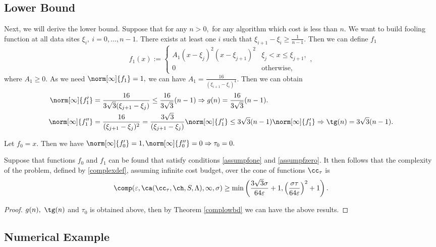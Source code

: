 \subsection{Lower Bound}
Next, we will derive the lower bound. Suppose that for any $n>0,$ for any algorithm which cost is less than $n.$
We want to build fooling function at all data sites $\xi_{i}, \ i=0,\ldots,n-1.$
There exists at least one $i$ such that $\xi_{i+1}-\xi_{i}\ge\frac{1}{n-1}.$
Then we can define $f_{1}$
$$f_{1}(x):=\left\{\begin{matrix}
A_{1}(x-\xi_{j})^{2}(x-\xi_{j+1})^{2} & \xi_{j}< x \leq \xi_{j+1},\\
0 & \text{otherwise},
\end{matrix}\right.,$$
where $A_{1} \ge 0.$ As we need $\norm[\infty]{f_1}=1,$ we can have $A_{1}=\frac{16}{(\xi_{i+1}-\xi_{i})^4}.$
Then we can obtain
\begin{align*}
\norm[\infty]{f'_1}&=\frac{16}{3\sqrt{3}(\xi_{j+1}-\xi_{j})}\leq \frac{16}{3\sqrt{3}}(n-1) \Rightarrow g(n)=\frac{16}{3\sqrt{3}}(n-1).\\
\norm[\infty]{f''_1}&=\frac{16}{(\xi_{j+1}-\xi_{j})^2}
=\frac{3\sqrt{3}}{(\xi_{j+1}-\xi_{j})}\norm[\infty]{f'_1}
 \leq 3\sqrt{3}(n-1)\norm[\infty]{f'_1}\Rightarrow \tg(n)=3\sqrt{3}(n-1).
\end{align*}

Let $f_0=x.$ Then we have $\norm[\infty]{f'_0}=1, \norm[\infty]{f''_0}=0 \Rightarrow \tau_0=0.$

\begin{theorem} \label{complowbdappr} Suppose that functions $f_{0}$ and $f_1$ can be found that satisfy conditions \eqref{assumpfone} and \eqref{assumpfzero}.  It then follows that the complexity of the problem, defined by \eqref{complexdef}, assuming infinite cost budget, over the cone of functions $\cc_{\tau}$ is
$$
\comp(\varepsilon,\ca(\cc_{\tau},\ch,S,\Lambda),\infty,\sigma)
\ge \min\left(\frac{3\sqrt{3}\sigma}{64 \varepsilon}+1, \left(\frac{\sigma\tau}{64\varepsilon}\right)^{2}+1 \right).
$$
\end{theorem}

\begin{proof}
$g(n), \ \tg(n)$ and $\tau_0$ is obtained above, then by Theorem \ref{complowbd}
we can have the above results.
\end{proof}

\subsection{Numerical Example}

